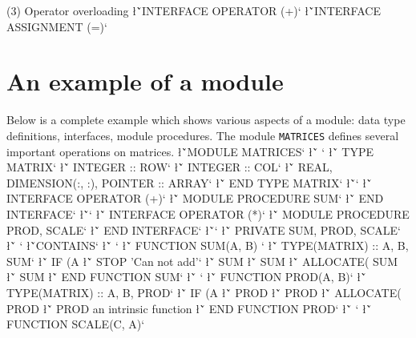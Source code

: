 {{(3) Operator overloading
\sms
\l{\v`INTERFACE OPERATOR (+)`}
\l{\v`INTERFACE ASSIGNMENT (=)`}

\section{An example of a module}

Below is a complete example which shows various aspects of a module:
data type definitions, interfaces, module procedures.  The module
{\tt MATRICES} defines several important operations on matrices.
\sms
\l{\v`MODULE MATRICES`}
\l{\v` `\m{}}
\l{\v`   TYPE MATRIX`}
\l{\v`      INTEGER :: ROW`}
\l{\v`      INTEGER :: COL`}
\l{\v`      REAL, DIMENSION(:, :), POINTER :: ARRAY`}
\l{\v`   END TYPE MATRIX`\m{}}
\l{\v``\m{}}
\l{\v`   INTERFACE OPERATOR (+)`}
\l{\v`      MODULE PROCEDURE SUM`}
\l{\v`   END INTERFACE`}
\l{\v``\m{}}
\l{\v`   INTERFACE OPERATOR (*)`}
\l{\v`      MODULE PROCEDURE PROD, SCALE`}
\l{\v`   END INTERFACE`\m{}}
\l{\v``\m{}}
\l{\v`   PRIVATE SUM, PROD, SCALE`}
\l{\v` `\m{}}
\l{\v`CONTAINS`}
\l{\v` `\m{}}
\l{\v`   FUNCTION SUM(A, B) `\m{}}
\l{\v`      TYPE(MATRIX) :: A, B, SUM`\m{}}
\l{\v`      IF (A%
\l{\v`         STOP 'Can not add'`}
\l{\v`      SUM%
\l{\v`      SUM%
\l{\v`      ALLOCATE( SUM%
\l{\v`      SUM%
\l{\v`   END FUNCTION SUM`\m{}}
\l{\v` `\m{}}
\l{\v`   FUNCTION PROD(A, B)`\m{}}
\l{\v`      TYPE(MATRIX) :: A, B, PROD`\m{}}
\l{\v`      IF (A%
\l{\v`      PROD%
\l{\v`      PROD%
\l{\v`      ALLOCATE( PROD%
\l{\v`      PROD%
					an intrinsic function}}
\l{\v`   END FUNCTION PROD`\m{}}
\l{\v`   `\m{}}
\l{\v`   FUNCTION SCALE(C, A)`}
}}}}}}}}}}
